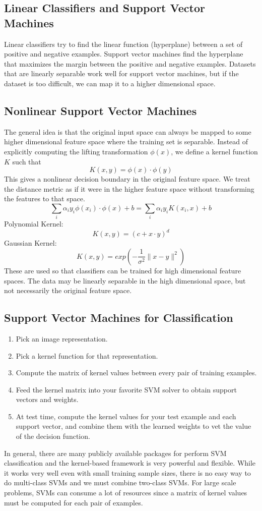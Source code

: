 \documentclass{math}
\begin{document}
\subsection*{Linear Classifiers and Support Vector Machines}
Linear classifiers try to find the linear function (hyperplane) between a set
of positive and negative examples. Support vector machines find the hyperplane
that maximizes the margin between the positive and negative examples. Datasets
that are linearly separable work well for support vector machines, but if the
dataset is too difficult, we can map it to a higher dimensional space.

\subsection*{Nonlinear Support Vector Machines}
The general idea is that the original input space can always be mapped to some
higher dimensional feature space where the training set is separable. Instead of
explicitly computing the lifting transformation \( \phi(x) \), we define a
kernel function \( K \) such that
\[ K(x,y) = \phi(x)\cdot\phi(y) \]
This gives a nonlinear decision boundary in the original feature space. We
treat the distance metric as if it were in the higher feature space without
transforming the features to that space.
\[ \sum_{i}\alpha_iy_i\phi(x_i)\cdot\phi(x)+b = \sum_{i}\alpha_iy_iK(x_i,x)+b \]
Polynomial Kernel:
\[ K(x,y) = (c+x\cdot y)^d \]
Gaussian Kernel:
\[ K(x,y) = exp\left(-\frac{1}{\sigma^2}\|x-y\|^2\right) \]
These are used so that classifiers can be trained for high dimensional feature
spaces. The data may be linearly separable in the high dimensional space, but
not necessarily the original feature space.

\subsection*{Support Vector Machines for Classification}
\begin{enumerate}
  \item Pick an image representation.
  \item Pick a kernel function for that representation.
  \item Compute the matrix of kernel values between every pair of training
    examples.
  \item Feed the kernel matrix into your favorite SVM solver to obtain support
    vectors and weights.
  \item At test time, compute the kernel values for your test example and each
    support vector, and combine them with the learned weights to vet the value
    of the decision function.
\end{enumerate}
In general, there are many publicly available packages for perform SVM
classification and the kernel-based framework is very powerful and flexible.
While it works very well even with small training sample sizes, there is no
easy way to do multi-class SVMs and we must combine two-class SVMs. For
large scale problems, SVMs can consume a lot of resources since a matrix of
kernel values must be computed for each pair of examples.
\end{document}
